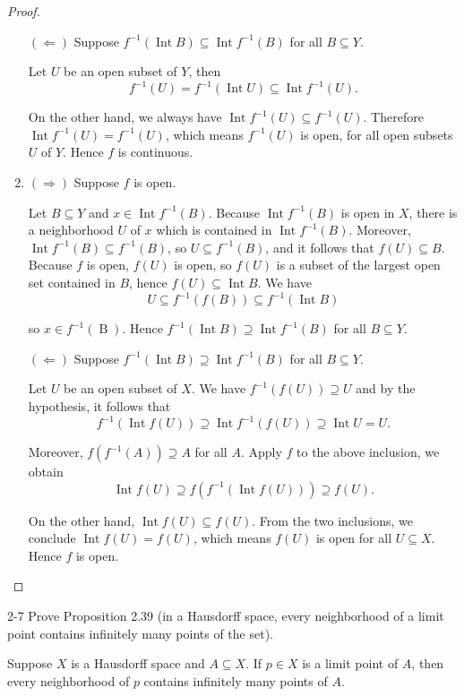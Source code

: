 \begin{proof}
\begin{enumerate}[label={(\alph*)}]
		      $(\Leftarrow)$ Suppose $f^{-1}(\operatorname{Int}B) \subseteq \operatorname{Int}f^{-1}(B)$ for all $B\subseteq Y$.

		      Let $U$ be an open subset of $Y$, then
		      \[
			      f^{-1}(U) = f^{-1}(\operatorname{Int}U) \subseteq \operatorname{Int}f^{-1}(U).
		      \]

		      On the other hand, we always have $\operatorname{Int} f^{-1}(U)\subseteq f^{-1}(U)$. Therefore $\operatorname{Int} f^{-1}(U) = f^{-1}(U)$, which means $f^{-1}(U)$ is open, for all open subsets $U$ of $Y$. Hence $f$ is continuous.
		\item $(\Rightarrow)$ Suppose $f$ is open.

		      Let $B\subseteq Y$ and $x\in \operatorname{Int}f^{-1}(B)$. Because $\operatorname{Int}f^{-1}(B)$ is open in $X$, there is a neighborhood $U$ of $x$ which is contained in $\operatorname{Int}f^{-1}(B)$. Moreover, $\operatorname{Int}f^{-1}(B)\subseteq f^{-1}(B)$, so $U\subseteq f^{-1}(B)$, and it follows that $f(U)\subseteq B$. Because $f$ is open, $f(U)$ is open, so $f(U)$ is a subset of the largest open set contained in $B$, hence $f(U)\subseteq \operatorname{Int}B$. We have
		      \[
			      U\subseteq f^{-1}(f(B))\subseteq f^{-1}(\operatorname{Int}B)
		      \]

		      so $x\in f^{-1}(\operatorname{B})$. Hence $f^{-1}(\operatorname{Int}B)\supseteq \operatorname{Int}f^{-1}(B)$ for all $B\subseteq Y$.

		      $(\Leftarrow)$ Suppose $f^{-1}(\operatorname{Int}B)\supseteq \operatorname{Int}f^{-1}(B)$ for all $B\subseteq Y$.

		      Let $U$ be an open subset of $X$. We have $f^{-1}(f(U))\supseteq U$ and by the hypothesis, it follows that
		      \[
			      f^{-1}(\operatorname{Int}f(U)) \supseteq \operatorname{Int}f^{-1}(f(U)) \supseteq \operatorname{Int}U = U.
		      \]

		      Moreover, $f(f^{-1}(A))\supseteq A$ for all $A$. Apply $f$ to the above inclusion, we obtain
		      \[
			      \operatorname{Int}f(U)\supseteq f(f^{-1}(\operatorname{Int}f(U)))\supseteq f(U).
		      \]

		      On the other hand, $\operatorname{Int}f(U)\subseteq f(U)$. From the two inclusions, we conclude $\operatorname{Int}f(U) = f(U)$, which means $f(U)$ is open for all $U\subseteq X$. Hence $f$ is open.
	\end{enumerate}
\end{proof}

\begin{problem}{2-7}
Prove Proposition 2.39 (in a Hausdorff space, every neighborhood of a limit point contains infinitely many points of the set).

Suppose $X$ is a Hausdorff space and $A\subseteq X$. If $p\in X$ is a limit point of $A$, then every neighborhood of $p$ contains infinitely many points of $A$.
\end{problem}

